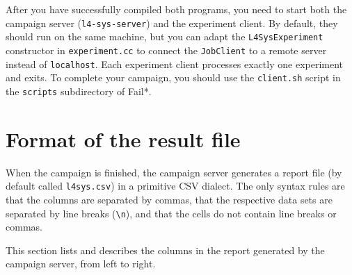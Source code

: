\documentclass[a4paper,10pt]{article}
\begin{document}
After you have successfully compiled both programs, you need to
start both the campaign server (\texttt{l4-sys-server})
and the experiment client. By default, they should run on the
same machine, but you can adapt the \texttt{L4SysExperiment}
constructor in \texttt{experiment.cc} to connect the \texttt{JobClient}
to a remote server instead of \texttt{localhost}. Each experiment client processes
exactly one experiment and exits. To complete your campaign,
you should use the \texttt{client.sh} script in the \texttt{scripts}
subdirectory of Fail*.

\section{Format of the result file}

When the campaign is finished, the campaign server generates a report
file (by default called \texttt{l4sys.csv}) in a primitive CSV dialect.
The only syntax rules are that the columns are separated by commas,
that the respective data sets are separated by line breaks (\verb+\n+),
and that the cells do not contain line breaks or commas.

This section lists and describes the columns in the report generated by
the campaign server, from left to right.
\end{document}
